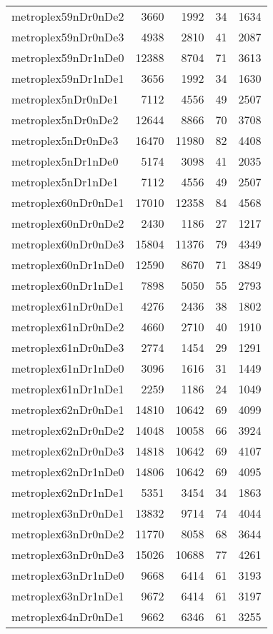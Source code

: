 \begin{longtable}{lrrrr}
metroplex59nDr0nDe2 & 3660 & 1992 & 34 & 1634 \\
metroplex59nDr0nDe3 & 4938 & 2810 & 41 & 2087 \\
metroplex59nDr1nDe0 & 12388 & 8704 & 71 & 3613 \\
metroplex59nDr1nDe1 & 3656 & 1992 & 34 & 1630 \\
metroplex5nDr0nDe1 & 7112 & 4556 & 49 & 2507 \\
metroplex5nDr0nDe2 & 12644 & 8866 & 70 & 3708 \\
metroplex5nDr0nDe3 & 16470 & 11980 & 82 & 4408 \\
metroplex5nDr1nDe0 & 5174 & 3098 & 41 & 2035 \\
metroplex5nDr1nDe1 & 7112 & 4556 & 49 & 2507 \\
metroplex60nDr0nDe1 & 17010 & 12358 & 84 & 4568 \\
metroplex60nDr0nDe2 & 2430 & 1186 & 27 & 1217 \\
metroplex60nDr0nDe3 & 15804 & 11376 & 79 & 4349 \\
metroplex60nDr1nDe0 & 12590 & 8670 & 71 & 3849 \\
metroplex60nDr1nDe1 & 7898 & 5050 & 55 & 2793 \\
metroplex61nDr0nDe1 & 4276 & 2436 & 38 & 1802 \\
metroplex61nDr0nDe2 & 4660 & 2710 & 40 & 1910 \\
metroplex61nDr0nDe3 & 2774 & 1454 & 29 & 1291 \\
metroplex61nDr1nDe0 & 3096 & 1616 & 31 & 1449 \\
metroplex61nDr1nDe1 & 2259 & 1186 & 24 & 1049 \\
metroplex62nDr0nDe1 & 14810 & 10642 & 69 & 4099 \\
metroplex62nDr0nDe2 & 14048 & 10058 & 66 & 3924 \\
metroplex62nDr0nDe3 & 14818 & 10642 & 69 & 4107 \\
metroplex62nDr1nDe0 & 14806 & 10642 & 69 & 4095 \\
metroplex62nDr1nDe1 & 5351 & 3454 & 34 & 1863 \\
metroplex63nDr0nDe1 & 13832 & 9714 & 74 & 4044 \\
metroplex63nDr0nDe2 & 11770 & 8058 & 68 & 3644 \\
metroplex63nDr0nDe3 & 15026 & 10688 & 77 & 4261 \\
metroplex63nDr1nDe0 & 9668 & 6414 & 61 & 3193 \\
metroplex63nDr1nDe1 & 9672 & 6414 & 61 & 3197 \\
metroplex64nDr0nDe1 & 9662 & 6346 & 61 & 3255 \\

\end{longtable}
